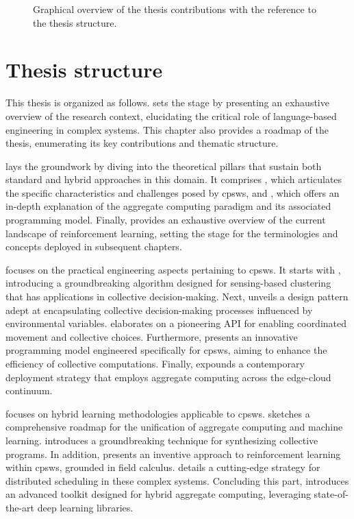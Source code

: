\begin{refsection}
\begin{figure}
    \caption{Graphical overview of the thesis contributions with the reference to the thesis structure.}\label{fig:contributions}
\end{figure}
\section{Thesis structure}
This thesis is organized as follows.
 sets the stage by presenting an exhaustive overview of the research context, 
 elucidating the critical role of language-based engineering in complex systems. 
 This chapter also provides a roadmap of the thesis, enumerating its key contributions and thematic structure.

 lays the groundwork by diving into the theoretical pillars that sustain both standard and hybrid approaches in this domain. 
 It comprises , which articulates the specific characteristics and challenges posed by \acp{cpsw}, and , 
 which offers an in-depth explanation of the aggregate computing paradigm and its associated programming model.
 Finally,  provides an exhaustive overview of the current landscape of reinforcement learning, 
 setting the stage for the terminologies and concepts deployed in subsequent chapters. 

 focuses on the practical engineering aspects pertaining to \acp{cpsw}. 
 It starts with , introducing a groundbreaking algorithm designed for sensing-based clustering that has applications in collective decision-making. 
 Next,  unveils a design pattern adept at encapsulating collective decision-making processes influenced by environmental variables. 
  elaborates on a pioneering API for enabling coordinated movement and collective choices.
 Furthermore,  presents an innovative programming model engineered specifically for \acp{cpsw}, aiming to enhance the efficiency of collective computations. 
 Finally,  expounds a contemporary deployment strategy that employs aggregate computing across the edge-cloud continuum.

 focuses on hybrid learning methodologies applicable to \acp{cpsw}.  
  sketches a comprehensive roadmap for the unification of aggregate computing and machine learning. 
  introduces a groundbreaking technique for synthesizing collective programs. 
 In addition,  presents an inventive approach to reinforcement learning within \acp{cpsw}, grounded in field calculus. 
  details a cutting-edge strategy for distributed scheduling in these complex systems. 
 Concluding this part,  introduces an advanced toolkit designed for hybrid aggregate computing, 
 leveraging state-of-the-art deep learning libraries.


\end{refsection}
